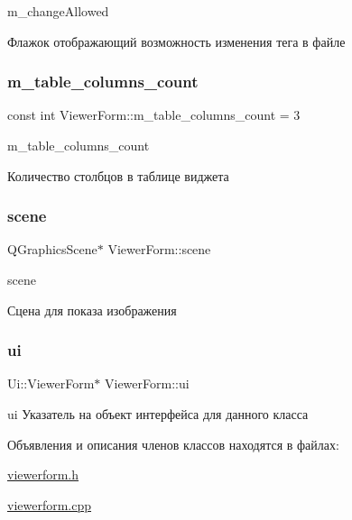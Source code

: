 m\+\_\+change\+Allowed 

Флажок отображающий возможность изменения тега в файле \mbox{\label{classViewerForm_aec8417758835f4b71657413c06eec160}} 
\subsubsection{\texorpdfstring{m\+\_\+table\+\_\+columns\+\_\+count}{m\_table\_columns\_count}}
{\footnotesize\ttfamily const int Viewer\+Form\+::m\+\_\+table\+\_\+columns\+\_\+count = 3\hspace{0.3cm}{\ttfamily [private]}}



m\+\_\+table\+\_\+columns\+\_\+count 

Количество столбцов в таблице виджета \mbox{\label{classViewerForm_a65bd3ad0087e45497639bb3050084d0a}} 
\subsubsection{\texorpdfstring{scene}{scene}}
{\footnotesize\ttfamily Q\+Graphics\+Scene$\ast$ Viewer\+Form\+::scene}



scene 

Сцена для показа изображения \mbox{\label{classViewerForm_a0e264f78c6535b2442b03629ebdc0347}} 
\subsubsection{\texorpdfstring{ui}{ui}}
{\footnotesize\ttfamily Ui\+::\+Viewer\+Form$\ast$ Viewer\+Form\+::ui\hspace{0.3cm}{\ttfamily [private]}}



ui Указатель на объект интерфейса для данного класса 



Объявления и описания членов классов находятся в файлах\+:\begin{DoxyCompactItemize}
\item 
\hyperlink{viewerform_8h}{viewerform.\+h}\item 
\hyperlink{viewerform_8cpp}{viewerform.\+cpp}\end{DoxyCompactItemize}
